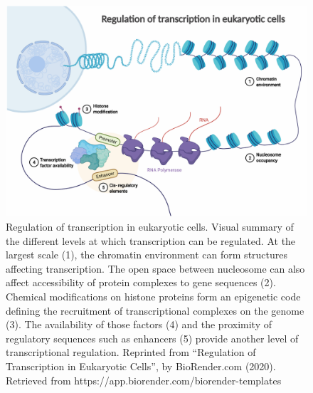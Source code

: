 \begin{figure}
    \includegraphics[width=\textwidth]{Parts/Part01/gfx/transcriptional_regulation_levels.pdf}
    \caption[Regulation of transcription in eukaryotic cells.]{Regulation of transcription in eukaryotic cells. Visual summary of the different levels at which transcription can be regulated. At the largest scale (1), the chromatin environment can form structures affecting transcription. The open space between nucleosome can also affect accessibility of protein complexes to gene sequences (2). Chemical modifications on histone proteins form an epigenetic code defining the recruitment of transcriptional complexes on the genome (3). The availability of those factors (4) and the proximity of regulatory sequences such as enhancers (5) provide another level of transcriptional regulation. Reprinted from “Regulation of Transcription in Eukaryotic Cells”, by BioRender.com (2020). Retrieved from https://app.biorender.com/biorender-templates }
    \label{fig:01-02:transcriptional-regulation}
\end{figure}

